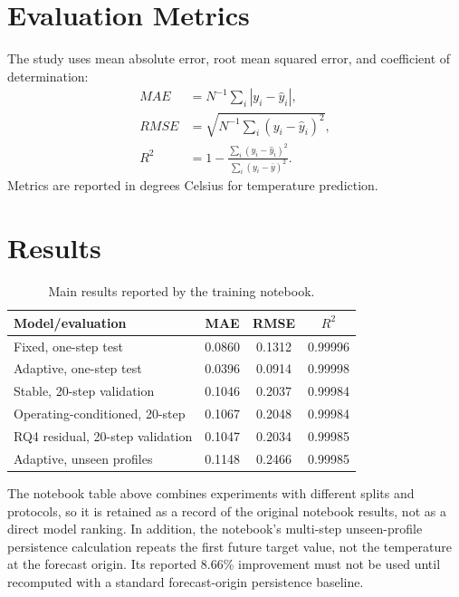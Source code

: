 \documentclass[conference]{IEEEtran}
\begin{document}
\section{Evaluation Metrics}
The study uses mean absolute error, root mean squared error, and coefficient of
determination:
\begin{align}
 MAE &= N^{-1}\sum_i|y_i-\hat y_i|,\\
 RMSE &= \sqrt{N^{-1}\sum_i(y_i-\hat y_i)^2},\\
 R^2 &= 1-\frac{\sum_i(y_i-\hat y_i)^2}{\sum_i(y_i-\bar y)^2}.
\end{align}
Metrics are reported in degrees Celsius for temperature prediction.

\section{Results}
\begin{table}[!t]
\centering
\caption{Main results reported by the training notebook.}
\label{tab:results}
\begin{tabular}{lccc}
\toprule
Model/evaluation & MAE & RMSE & $R^2$\\
\midrule
Fixed, one-step test & 0.0860 & 0.1312 & 0.99996\\
Adaptive, one-step test & 0.0396 & 0.0914 & 0.99998\\
Stable, 20-step validation & 0.1046 & 0.2037 & 0.99984\\
Operating-conditioned, 20-step & 0.1067 & 0.2048 & 0.99984\\
RQ4 residual, 20-step validation & 0.1047 & 0.2034 & 0.99985\\
Adaptive, unseen profiles & 0.1148 & 0.2466 & 0.99985\\
\bottomrule
\end{tabular}
\end{table}

The notebook table above combines experiments with different splits and
protocols, so it is retained as a record of the original notebook results,
not as a direct model ranking. In addition, the notebook's multi-step
unseen-profile persistence calculation repeats the first future target value,
not the temperature at the forecast origin. Its reported 8.66\% improvement
must not be used until recomputed with a standard forecast-origin persistence
baseline.
\end{document}

